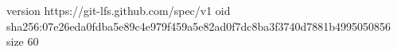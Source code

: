 version https://git-lfs.github.com/spec/v1
oid sha256:07e26eda0fdba5e89c4e979f459a5e82ad0f7dc8ba3f3740d7881b4995050856
size 60
